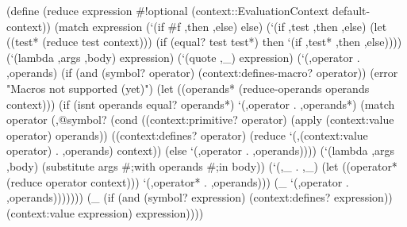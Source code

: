 \documentclass[acmsmall]{acmart}
\newenvironment{Snippet}{\Verbatim[samepage=true]}{\endVerbatim}
\begin{document}
\begin{Snippet}
(define (reduce expression #!optional (context::EvaluationContext default-context))
  (match expression
    (`(if #f ,then ,else)
     else)
\end{Snippet}
\begin{Snippet}
    (`(if ,test ,then ,else)
     (let ((test* (reduce test context)))
       (if (equal? test test*)
	   then
	   `(if ,test* ,then ,else))))
\end{Snippet}
\begin{Snippet}
    (`(lambda ,args ,body)
     expression)
\end{Snippet}
\begin{Snippet}
    (`(quote ,_)
     expression)
\end{Snippet}
\begin{Snippet}
    (`(,operator . ,operands)
     (if (and (symbol? operator)
	      (context:defines-macro? operator))
	 (error "Macros not supported (yet)")
	 (let ((operands* (reduce-operands operands context)))
	   (if (isnt operands equal? operands*)
	       `(,operator . ,operands*)
	       (match operator
		 (,@symbol?
\end{Snippet}
\begin{Snippet}
		  (cond ((context:primitive? operator)
			 (apply (context:value operator) operands))
\end{Snippet}
\begin{Snippet}
			((context:defines? operator)
			 (reduce `(,(context:value operator) . ,operands)
				 context))
\end{Snippet}
\begin{Snippet}
			(else
			 `(,operator . ,operands))))
\end{Snippet}
\begin{Snippet}                                 
		 (`(lambda ,args ,body)
		  (substitute args #;with operands #;in body))
\end{Snippet}
\begin{Snippet}
		 (`(,_ . ,_)
		  (let ((operator* (reduce operator context)))
		    `(,operator* . ,operands)))
\end{Snippet}
\begin{Snippet}
		 (_
		  `(,operator . ,operands)))))))
\end{Snippet}
\begin{Snippet}
    (_
     (if (and (symbol? expression)
	      (context:defines? expression))
	 (context:value expression)
	 expression))))
\end{Snippet}
\end{document}
